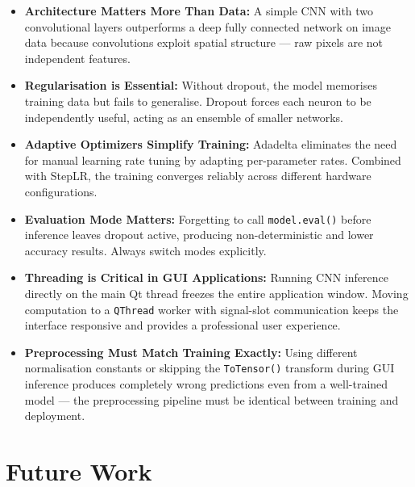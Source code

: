 \documentclass[12pt,a4paper,openany]{report}
\begin{document}
\begin{itemize}
    \item \textbf{Architecture Matters More Than Data:} A simple CNN with two convolutional layers outperforms a deep fully connected network on image data because convolutions exploit spatial structure --- raw pixels are not independent features.
    \item \textbf{Regularisation is Essential:} Without dropout, the model memorises training data but fails to generalise. Dropout forces each neuron to be independently useful, acting as an ensemble of smaller networks.
    \item \textbf{Adaptive Optimizers Simplify Training:} Adadelta eliminates the need for manual learning rate tuning by adapting per-parameter rates. Combined with StepLR, the training converges reliably across different hardware configurations.
    \item \textbf{Evaluation Mode Matters:} Forgetting to call \texttt{model.eval()} before inference leaves dropout active, producing non-deterministic and lower accuracy results. Always switch modes explicitly.
    \item \textbf{Threading is Critical in GUI Applications:} Running CNN inference directly on the main Qt thread freezes the entire application window. Moving computation to a \texttt{QThread} worker with signal-slot communication keeps the interface responsive and provides a professional user experience.
    \item \textbf{Preprocessing Must Match Training Exactly:} Using different normalisation constants or skipping the \texttt{ToTensor()} transform during GUI inference produces completely wrong predictions even from a well-trained model --- the preprocessing pipeline must be identical between training and deployment.
\end{itemize}

\chapter{Future Work}
\end{document}
